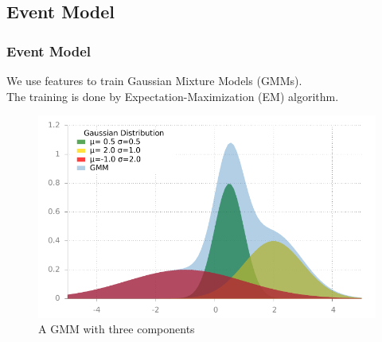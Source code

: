 \documentclass[xcolor=table,slidestop,compress,mathserif]{beamer}
\begin{document}
\subsection{Event Model}
\begin{frame}
	\frametitle{Event Model}	
	We use features to train Gaussian Mixture Models (GMMs). \\ 
	The training is done by Expectation-Maximization (EM) algorithm. \\  
	\begin{figure}
		\includegraphics[scale=0.6]{figure/gmm.pdf}
		\caption{A GMM with three components}
	\end{figure}
\end{frame}
\end{document}
